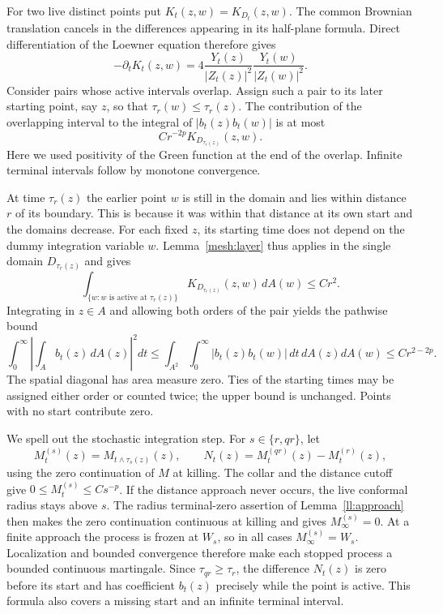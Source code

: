 \documentclass[11pt]{article}
\theoremstyle{definition}
\theoremstyle{remark}
\numberwithin{equation}{section}
\begin{document}
For two live distinct points put $K_t(z,w)=K_{D_t}(z,w)$.  The common
Brownian translation cancels in the differences appearing in its
half-plane formula.  Direct differentiation of the Loewner equation
therefore gives
\begin{equation}
 -\partial_tK_t(z,w)
 =4\frac{Y_t(z)}{|Z_t(z)|^2}\frac{Y_t(w)}{|Z_t(w)|^2}.
 \label{mesh:green-decrease}
\end{equation}
Consider pairs whose active intervals overlap.  Assign such a pair to
its later starting point, say $z$, so that
$\tau_r(w)\le\tau_r(z)$.  The contribution of the overlapping
interval to the integral of $|b_t(z)b_t(w)|$ is at most
\begin{equation}
 Cr^{-2p}K_{D_{\tau_r(z)}}(z,w).
 \label{mesh:pair-bound}
\end{equation}
Here we used positivity of the Green function at the end of the
overlap.  Infinite terminal intervals follow by monotone convergence.

At time $\tau_r(z)$ the earlier point $w$ is still in the domain and
lies within distance $r$ of its boundary.  This is because it was
within that distance at its own start and the domains decrease.
For each fixed $z$, its starting time does not depend on the dummy
integration variable $w$.  Lemma~\ref{mesh:layer} thus applies in the
single domain $D_{\tau_r(z)}$ and gives
\[
 \int_{\{w:\text{$w$ is active at $\tau_r(z)$}\}}
 K_{D_{\tau_r(z)}}(z,w)\,dA(w)\le Cr^2.
\]
Integrating in $z\in A$ and allowing both orders of the pair yields
the pathwise bound
\begin{equation}
 \int_0^\infty\left|\int_A b_t(z)\,dA(z)\right|^2dt
 \le\int_{A^2}\int_0^\infty |b_t(z)b_t(w)|\,dt\,dA(z)dA(w)
 \le Cr^{2-2p}.
 \label{mesh:bracket-bound}
\end{equation}
The spatial diagonal has area measure zero.  Ties of the starting
times may be assigned either order or counted twice; the upper bound
is unchanged.  Points with no start contribute zero.

We spell out the stochastic integration step.  For $s\in\{r,qr\}$,
let
\[
 M_t^{(s)}(z)=M_{t\wedge\tau_s(z)}(z),
 \qquad N_t(z)=M_t^{(qr)}(z)-M_t^{(r)}(z),
\]
using the zero continuation of $M$ at killing.  The collar and the
distance cutoff give $0\le M_t^{(s)}\le Cs^{-p}$.
If the distance approach never occurs, the live conformal radius
stays above $s$.  The radius terminal-zero assertion of
Lemma~\ref{ll:approach} then makes the zero continuation continuous
at killing and gives $M_\infty^{(s)}=0$.  At a finite approach the
process is frozen at $W_s$, so in all cases $M_\infty^{(s)}=W_s$.
Localization and bounded convergence therefore make each
stopped process a bounded continuous martingale.  Since
$\tau_{qr}\ge\tau_r$, the difference $N_t(z)$ is zero before its
start and has coefficient $b_t(z)$ precisely while the point is
active.  This formula also covers a missing start and an infinite
terminal interval.
\end{document}
